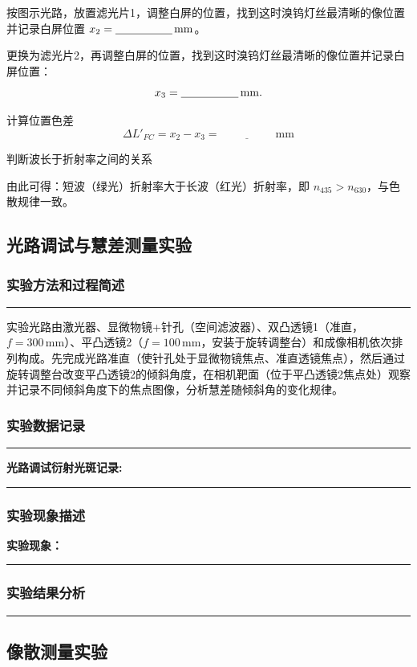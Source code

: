 \documentclass[dvipsnames, svgnames,a4paper,11pt]{article}
\newcommand{\recordblank}[1]{%
  \par\noindent\rule{0.95\linewidth}{0pt}\rule{0pt}{#1}\par}
\begin{document}
按图示光路，放置滤光片1，调整白屏的位置，找到这时溴钨灯丝最清晰的像位置并记录白屏位置 $x_2=\underline{\hspace{1.8cm}}\,\mathrm{mm}$。


更换为滤光片2，再调整白屏的位置，找到这时溴钨灯丝最清晰的像位置并记录白屏位置：
\[
x_3=\underline{\hspace{1.8cm}}\,\mathrm{mm}.
\]

计算位置色差 $$\Delta L'_{FC}=x_2-x_3=\underline{\hspace{2cm}}\,\mathrm{mm}$$

判断波长于折射率之间的关系

由此可得：短波（绿光）折射率大于长波（红光）折射率，即 $n_{435} > n_{630}$，与色散规律一致。

\subsection{光路调试与慧差测量实验}

\subsubsection{实验方法和过程简述}


\recordblank{5cm}
实验光路由激光器、显微物镜+针孔（空间滤波器）、双凸透镜1（准直，$f=300\,\text{mm}$）、平凸透镜2（$f=100\,\text{mm}$，安装于旋转调整台）和成像相机依次排列构成。先完成光路准直（使针孔处于显微物镜焦点、准直透镜焦点），然后通过旋转调整台改变平凸透镜2的倾斜角度，在相机靶面（位于平凸透镜2焦点处）观察并记录不同倾斜角度下的焦点图像，分析慧差随倾斜角的变化规律。

\subsubsection{实验数据记录}
\recordblank{5.5cm}
\clearpage
\noindent\textbf{光路调试衍射光斑记录:}

\recordblank{6cm}


\subsubsection{实验现象描述}
\noindent\textbf{实验现象：}\par
\recordblank{4.5cm}
\subsubsection{实验结果分析}
\recordblank{5.5cm}
\subsection{像散测量实验}
\end{document}
